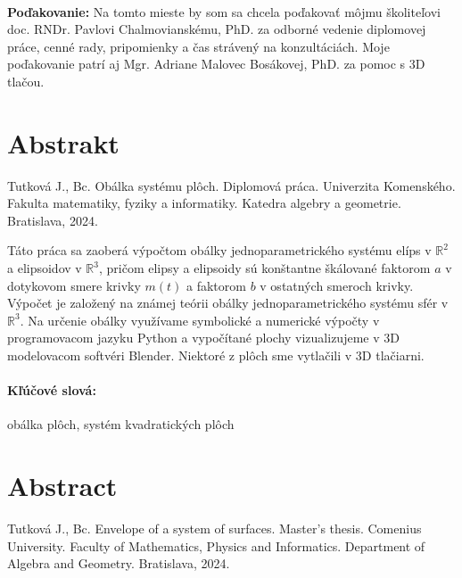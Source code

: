 \documentclass[12pt, twoside]{book}
\theoremstyle{definition}
\begin{document}

\frontmatter

\setcounter{page}{3}
\newpage 
~

\vfill
{\bf Poďakovanie:} Na tomto mieste by som sa chcela poďakovať môjmu školiteľovi
doc. RNDr. Pavlovi Chalmovianskému, PhD. za odborné vedenie diplomovej práce, cenné rady, pripomienky a čas strávený na konzultáciách. Moje poďakovanie patrí aj Mgr. Adriane Malovec Bosákovej, PhD. za pomoc s 3D tlačou.


\newpage 
\section*{Abstrakt}
Tutková J., Bc. Obálka systému plôch. Diplomová práca. Univerzita Komenského. Fakulta matematiky, fyziky a informatiky. Katedra algebry a geometrie. Bratislava, 2024.
\vspace{\baselineskip}

\noindent Táto práca sa zaoberá výpočtom obálky jednoparametrického systému elíps v $\mathbb{R}^2$ a elipsoidov v $\mathbb{R}^3$, pričom elipsy a elipsoidy sú konštantne škálované faktorom $a$ v dotykovom smere krivky $m(t)$ a faktorom $b$ v ostatných smeroch krivky. Výpočet je založený na známej teórii obálky jednoparametrického systému sfér v $\mathbb{R}^3.$ Na určenie obálky využívame symbolické a numerické výpočty v programovacom jazyku Python a vypočítané plochy vizualizujeme v 3D modelovacom softvéri Blender. Niektoré z plôch sme vytlačili v 3D tlačiarni.

\paragraph*{Kľúčové slová:} obálka plôch, systém kvadratických plôch


\newpage
\section*{Abstract} 
Tutková J., Bc. Envelope of a system of surfaces. Master's thesis. Comenius University. Faculty of Mathematics, Physics and Informatics. Department of Algebra and Geometry. Bratislava, 2024.
\vspace{\baselineskip}
\end{document}
